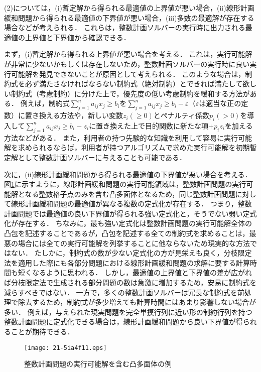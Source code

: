 \documentclass[japanese]{jnlp_1.4}
\begin{document}
(2)については，(i)暫定解から得られる最適値の上界値が悪い場合，(ii)線形計画緩和問題から得られる最適値の下界値が悪い場合，(iii)多数の最適解が存在する場合などが考えられる．
これらは，整数計画ソルバーの実行時に出力される最適値の上界値と下界値から確認できる．

まず，(i)暫定解から得られる上界値が悪い場合を考える．
これは，実行可能解が非常に少ないかもしくは存在しないため，整数計画ソルバーの実行時に良い実行可能解を発見できないことが原因として考えられる．
このような場合は，制約式を必ず満たさなければならない制約式（絶対制約）とできれば満たして欲しい制約式（考慮制約）に分けた上で，優先度の低い考慮制約を緩和する方法がある．
例えば，制約式$\sum_{j=1}^n a_{ij} x_j \ge b_i$を$\sum_{j=1}^n a_{ij} x_j \ge b_i - \varepsilon$（$\varepsilon$は適当な正の定数）に置き換える方法や，新しい変数$z_i (\ge 0)$とペナルティ係数$p_i (> 0)$を導入して$\sum_{j=1}^n a_{ij} x_j \ge b_i - z_i$に置き換えた上で目的関数に新たな項$+ p_i z_i$を加える方法などがある．
また，利用者の持つ先験的な知識を利用して容易に実行可能解を求められるならば，利用者が持つアルゴリズムで求めた実行可能解を初期暫定解として整数計画ソルバーに与えることも可能である．

次に，(ii)線形計画緩和問題から得られる最適値の下界値が悪い場合を考える．
図\ref{fig:polyhedron}に示すように，線形計画緩和問題の実行可能領域は，整数計画問題の実行可能解となる整数格子点のみを含む凸多面体となるため，同じ整数計画問題に対して線形計画緩和問題の最適値が異なる複数の定式化が存在する．
つまり，整数計画問題では最適値の良い下界値が得られる強い定式化と，そうでない弱い定式化が存在する．
ちなみに，最も強い定式化は整数計画問題の実行可能解全体の凸包を記述することであるが，凸包を記述する全ての制約式を求めることは，最悪の場合には全ての実行可能解を列挙することに他ならないため現実的な方法ではない．
たしかに，制約式の数が少ない定式化の方が見栄えも良く，分枝限定法を適用した際にも各部分問題における線形計画緩和問題の求解に要する計算時間も短くなるように思われる．
しかし，最適値の上界値と下界値の差が広がれば分枝限定法で生成される部分問題の数は急激に増加するため，安易に制約式を減らすべきではない．
一方で，多くの整数計画ソルバーは冗長な制約式を前処理で除去するため，制約式が多少増えても計算時間にはあまり影響しない場合が多い．
例えば，与えられた現実問題を完全単摸行列に近い形の制約行列を持つ整数計画問題に定式化できる場合は，線形計画緩和問題から良い下界値が得られることが期待できる．

\begin{figure}[t]
\begin{center}
\texttt{[image: 21-5ia4f11.eps]}
\end{center}
\caption{整数計画問題の実行可能解を含む凸多面体の例}
\label{fig:polyhedron}
\end{figure}
\end{document}
